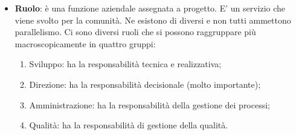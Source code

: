 \begin{itemize}
	\item \textbf{Ruolo}: è una funzione aziendale assegnata a progetto. E' un servizio che viene svolto per la comunità. Ne esistono di diversi e non tutti ammettono parallelismo. \newline
	Ci sono diversi ruoli che si possono raggruppare più macroscopicamente in quattro gruppi:
	\begin{enumerate}
		\item Sviluppo: ha la responsabilità tecnica e realizzativa;
		\item Direzione: ha la responsabilità decisionale (molto importante);
		\item Amministrazione: ha la responsabilità della gestione dei processi;
		\item Qualità: ha la responsabilità di gestione della qualità.
	\end{enumerate}

\end{itemize}
